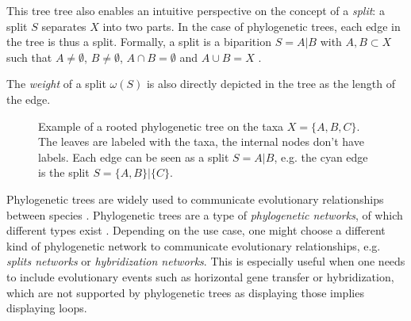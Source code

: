 This tree tree also enables an intuitive perspective on the concept of a
\textit{split}: a split $S$ separates $X$ into two parts. In the case of
phylogenetic trees, each edge in the tree is thus a split. Formally, a split is
a biparition $S=A|B$ with $A, B \subset X$ such that $A \neq \emptyset$, $B \neq
\emptyset$, $A \cap B = \emptyset$ and $A \cup B = X$
\cite{scornavaccaSplitsUnrootedPhylogenetic2010}.

The \textit{weight} of a split $\omega(S)$ is also directly depicted in the tree
as the length of the edge. 

\begin{figure}
  \centering
  \caption{Example of a rooted phylogenetic tree on the taxa $X = \{A, B, C\}$.
  The leaves are labeled with the taxa, the internal nodes don't have labels.
  Each edge can be seen as a split $S=A|B$, e.g. the cyan edge is the split $S =
  \{A, B\} | \{C\}$.}
  \label{fig:exampleTree}
\end{figure}

Phylogenetic trees are widely used to communicate evolutionary relationships
between species
\cite{mandalComparativeGenomeAnalysis2022,winkworthComparativeAnalysesComplete2022,ayala-usmaWholeGenomeDuplication2021}.
Phylogenetic trees are a type of \textit{phylogenetic networks}, of which
different types exist \cite{husonApplicationPhylogeneticNetworks2006}. Depending
on the use case, one might choose a different kind of phylogenetic network to
communicate evolutionary relationships, e.g. \textit{splits networks} or
\textit{hybridization networks}. This is especially useful when one needs to
include evolutionary events such as horizontal gene transfer or hybridization,
which are not supported by phylogenetic trees as displaying those implies
displaying loops. 

